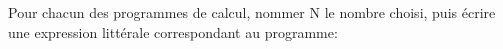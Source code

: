 \documentclass[exercice]{thedocument}%
\begin{document}
%
Pour chacun des programmes de calcul, nommer N le
nombre choisi, puis écrire une expression littérale correspondant au
programme:
{\small
    \medskip\par
}
\end{document}
